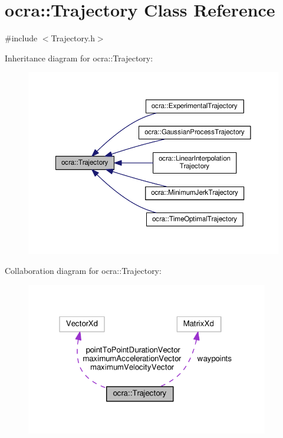 \hypertarget{classocra_1_1Trajectory}{}\section{ocra\+:\+:Trajectory Class Reference}
\label{classocra_1_1Trajectory}


{\ttfamily \#include $<$Trajectory.\+h$>$}



Inheritance diagram for ocra\+:\+:Trajectory\+:
\nopagebreak
\begin{figure}[H]
\begin{center}
\leavevmode
\includegraphics[width=350pt]{d1/dd5/classocra_1_1Trajectory__inherit__graph}
\end{center}
\end{figure}


Collaboration diagram for ocra\+:\+:Trajectory\+:
\nopagebreak
\begin{figure}[H]
\begin{center}
\leavevmode
\includegraphics[width=301pt]{dc/dda/classocra_1_1Trajectory__coll__graph}
\end{center}
\end{figure}

